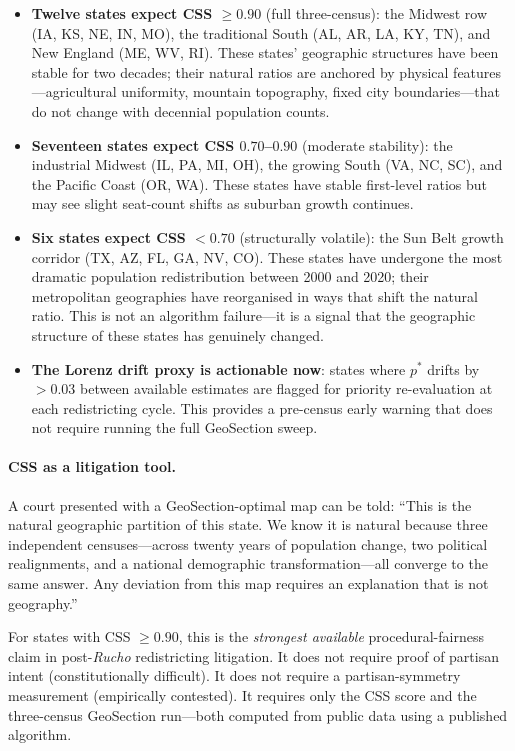 \begin{itemize}
\item \textbf{Twelve states expect CSS $\geq 0.90$} (full three-census):
  the Midwest row (IA, KS, NE, IN, MO), the traditional South (AL, AR, LA, KY,
  TN), and New England (ME, WV, RI).
  These states' geographic structures have been stable for two decades; their
  natural ratios are anchored by physical features---agricultural uniformity,
  mountain topography, fixed city boundaries---that do not change with
  decennial population counts.

\item \textbf{Seventeen states expect CSS $0.70$--$0.90$} (moderate stability):
  the industrial Midwest (IL, PA, MI, OH), the growing South (VA, NC, SC),
  and the Pacific Coast (OR, WA).
  These states have stable first-level ratios but may see slight seat-count
  shifts as suburban growth continues.

\item \textbf{Six states expect CSS $< 0.70$} (structurally volatile):
  the Sun Belt growth corridor (TX, AZ, FL, GA, NV, CO).
  These states have undergone the most dramatic population redistribution
  between 2000 and 2020; their metropolitan geographies have reorganised in
  ways that shift the natural ratio.
  This is not an algorithm failure---it is a signal that the geographic
  structure of these states has genuinely changed.

\item \textbf{The Lorenz drift proxy is actionable now}:
  states where $p^*$ drifts by $>0.03$ between available estimates are
  flagged for priority re-evaluation at each redistricting cycle.
  This provides a pre-census early warning that does not require running
  the full GeoSection sweep.
\end{itemize}

\paragraph{CSS as a litigation tool.}
A court presented with a GeoSection-optimal map can be told: ``This is the
natural geographic partition of this state.
We know it is natural because three independent censuses---across twenty years
of population change, two political realignments, and a national demographic
transformation---all converge to the same answer.
Any deviation from this map requires an explanation that is not geography.''

For states with CSS $\geq 0.90$, this is the \emph{strongest available}
procedural-fairness claim in post-\emph{Rucho} redistricting litigation.
It does not require proof of partisan intent (constitutionally difficult).
It does not require a partisan-symmetry measurement (empirically contested).
It requires only the CSS score and the three-census GeoSection run---both
computed from public data using a published algorithm.

